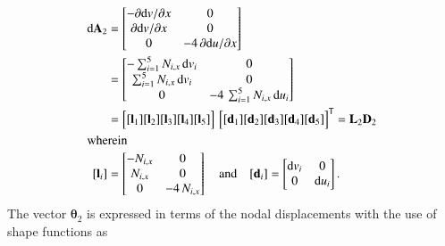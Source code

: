 \begin{subequations}
	\begin{align}
	\mathrm{d} \mathbf{A}_2 & =  \begin{bmatrix}
	- \partial \mathrm{d} v / \partial x &  0 \\
	\partial \mathrm{d} v / \partial x & 0 \\
	0 & -4 \, \partial \mathrm{d} u / \partial x  \end{bmatrix} \notag \\
	& = \begin{bmatrix}
	- \sum\nolimits_{i=1}^5 N_{i,x} \, \mathrm{d} v_i &  0 \\
	\sum\nolimits_{i=1}^5 N_{i,x} \, \mathrm{d} v_i &  0 \\
	0  & - 4 \, \sum\nolimits_{i=1}^5 N_{i,x} \, \mathrm{d} u_i  \end{bmatrix} \notag \\
	& = \begin{bmatrix}
	[\mathbf{l}_1] [\mathbf{l}_2] [\mathbf{l}_3] [\mathbf{l}_4] [\mathbf{l}_5] 
	\end{bmatrix}  \, \begin{bmatrix} [\mathbf{d}_1] [\mathbf{d}_2] [\mathbf{d}_3] [\mathbf{d}_4] [\mathbf{d}_5] \end{bmatrix}^{\mathsf{T}}
	= \mathbf{L}_2 \mathbf{D}_2 \\
	\intertext{wherein}
	[\mathbf{l}_i] & = \begin{bmatrix}
	- N_{i,x} &  0 \\
	N_{i,x} & 0 \\
	0  & - 4 \, N_{i,x} \end{bmatrix}  \quad \text{and} \quad	[\mathbf{d}_i] = \begin{bmatrix}
	\mathrm{d} v_i & 0 \\
	0 &  \mathrm{d} u_i  \end{bmatrix} .
	\end{align}
\end{subequations}
The vector $\boldsymbol{\theta}_2$ is expressed in terms of the nodal displacements with the use of shape functions as
